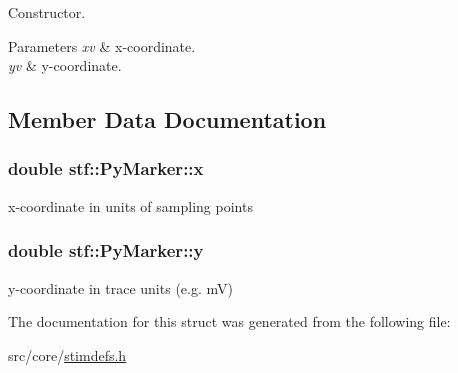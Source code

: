 Constructor. 


\begin{DoxyParams}{Parameters}
{\em xv} & x-\/coordinate. \\
\hline
{\em yv} & y-\/coordinate. \\
\hline
\end{DoxyParams}


\subsection{Member Data Documentation}
\hypertarget{structstf_1_1PyMarker_a6ae48b5897b21ccea4511db938dd46ce}{
\subsubsection[{x}]{\setlength{\rightskip}{0pt plus 5cm}double {\bf stf::PyMarker::x}}}
\label{structstf_1_1PyMarker_a6ae48b5897b21ccea4511db938dd46ce}
x-\/coordinate in units of sampling points \hypertarget{structstf_1_1PyMarker_a0d54ef4d998f32b1e5745c2fa7911fcd}{
\subsubsection[{y}]{\setlength{\rightskip}{0pt plus 5cm}double {\bf stf::PyMarker::y}}}
\label{structstf_1_1PyMarker_a0d54ef4d998f32b1e5745c2fa7911fcd}
y-\/coordinate in trace units (e.g. mV) 

The documentation for this struct was generated from the following file:\begin{DoxyCompactItemize}
\item 
src/core/\hyperlink{stimdefs_8h}{stimdefs.h}\end{DoxyCompactItemize}
